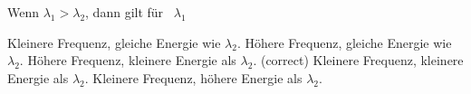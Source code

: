 \documentclass[11pt]{exam}
\begin{document}
\begin{questions}
\vspace{3mm}\question Wenn \( \lambda_1 > \lambda_2 \), dann gilt für  \( \lambda_1 \)

\begin{choices}
	\choice Kleinere Frequenz, gleiche Energie wie \( \lambda_2 \).
	\choice Höhere Frequenz, gleiche Energie wie \( \lambda_2 \).
	\choice Höhere Frequenz, kleinere Energie als \( \lambda_2 \). (correct)
	\choice Kleinere Frequenz, kleinere Energie als \( \lambda_2 \).
	\choice Kleinere Frequenz, höhere Energie als \( \lambda_2 \).
\end{choices}

\vspace{3mm}\end{questions}
\end{document}
